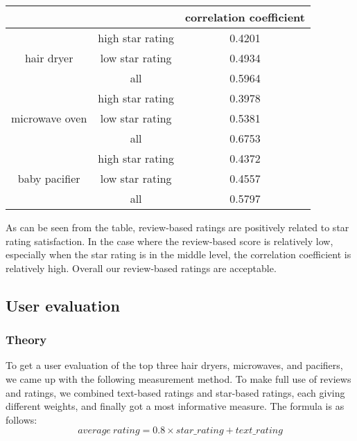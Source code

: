 \documentclass{mcmthesis}
\begin{document}
	
	
	\begin{table}[h]
		\begin{center} 
			\begin{tabular}{|c|c|c|}
				\hline
				&                  & correlation coefficient \\ \hline
				\multirow{3}{*}{hair dryer}     & high star rating & 0.4201                  \\ \cline{2-3} 
				& low star rating  & 0.4934                  \\ \cline{2-3} 
				& all              & 0.5964                  \\ \hline
				\multirow{3}{*}{microwave oven} & high star rating & 0.3978                  \\ \cline{2-3} 
				& low star rating  & 0.5381                  \\ \cline{2-3} 
				& all              & 0.6753                  \\ \hline
				\multirow{3}{*}{baby pacifier}  & high star rating & 0.4372                  \\ \cline{2-3} 
				& low star rating  & 0.4557                  \\ \cline{2-3} 
				& all              & 0.5797                  \\ \hline
			\end{tabular}
		\end{center}
	\end{table}
	
	
	As can be seen from the table, review-based ratings are positively related to star rating satisfaction. In the case where the review-based score is relatively low, especially when the star rating is in the middle level, the correlation coefficient is relatively high. Overall our review-based ratings are acceptable.
	
	
	\subsection{User evaluation}
	\subsubsection{Theory}
	To get a user evaluation of the top three hair dryers, microwaves, and pacifiers, we came up with the following measurement method. To make full use of reviews and ratings, we combined text-based ratings and star-based ratings, each giving different weights, and finally got a most informative measure. The formula is as follows:
	$$
	average\ rating = 0.8 \times star\_rating + text\_rating
	$$
	
\end{document}
